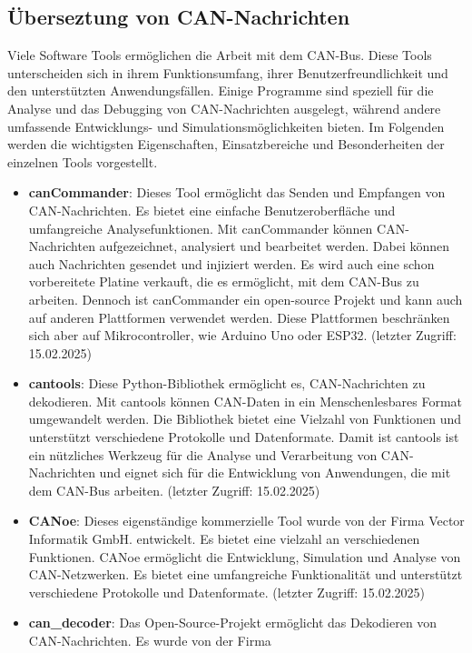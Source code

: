 \subsection{Überseztung von CAN-Nachrichten}
Viele Software Tools ermöglichen die Arbeit mit dem CAN-Bus. Diese Tools unterscheiden sich in ihrem Funktionsumfang, 
ihrer Benutzerfreundlichkeit 
und den unterstützten Anwendungsfällen. Einige Programme sind speziell für die Analyse und das Debugging von CAN-Nachrichten 
ausgelegt, während andere umfassende Entwicklungs- und Simulationsmöglichkeiten bieten. Im Folgenden werden die wichtigsten 
Eigenschaften, Einsatzbereiche und Besonderheiten der einzelnen Tools vorgestellt. \\
\begin{itemize}
    \item \textbf{canCommander}: Dieses Tool ermöglicht das Senden und Empfangen von CAN-Nachrichten. Es bietet eine einfache 
    Benutzeroberfläche und umfangreiche Analysefunktionen. Mit canCommander können CAN-Nachrichten aufgezeichnet, 
    analysiert und bearbeitet werden. Dabei können auch Nachrichten gesendet und injiziert werden. Es wird auch eine
    schon vorbereitete Platine verkauft, die es ermöglicht, mit dem CAN-Bus zu arbeiten. Dennoch ist canCommander ein
    open-source Projekt und kann auch auf anderen Plattformen verwendet werden. Diese Plattformen beschränken sich aber
    auf Mikrocontroller, wie Arduino Uno oder ESP32. \cite{can_commander} (letzter Zugriff: 15.02.2025)
    \item \textbf{cantools}: Diese Python-Bibliothek ermöglicht es, CAN-Nachrichten zu dekodieren. Mit cantools können 
    CAN-Daten in ein Menschenlesbares Format umgewandelt werden. Die Bibliothek 
    bietet eine Vielzahl von Funktionen und unterstützt verschiedene Protokolle und Datenformate. Damit ist cantools ist ein 
    nützliches Werkzeug für die Analyse und Verarbeitung von CAN-Nachrichten und eignet sich für die Entwicklung von 
    Anwendungen, die mit dem CAN-Bus arbeiten. \cite{cantools} (letzter Zugriff: 15.02.2025)
    \item \textbf{CANoe}: Dieses eigenständige kommerzielle Tool wurde von der Firma Vector Informatik GmbH. entwickelt.
    Es bietet eine vielzahl an verschiedenen Funktionen. CANoe ermöglicht die Entwicklung, Simulation und Analyse von
    CAN-Netzwerken. Es bietet eine umfangreiche Funktionalität und unterstützt verschiedene Protokolle und Datenformate.
    \cite{VectorCANoe} (letzter Zugriff: 15.02.2025)
    \item \textbf{can\_decoder}: Das Open-Source-Projekt ermöglicht das Dekodieren von CAN-Nachrichten. Es wurde von der Firma

\end{itemize}
